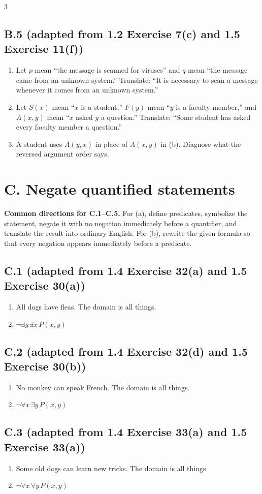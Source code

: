 \documentclass{article}
\newcommand{\problem}[2]{%
  \par
  \subsection*{#1 {\normalfont\footnotesize (#2)}}%
}
\begin{document}
\begin{multicols}{3}
\problem{B.5}{adapted from 1.2 Exercise 7(c) and 1.5 Exercise 11(f)}
\begin{enumerate}[label=(\alph*)]
  \item Let $p$ mean ``the message is scanned for viruses'' and $q$ mean ``the
        message came from an unknown system.'' Translate: ``It is necessary to
        scan a message whenever it comes from an unknown system.''
  \item Let $S(x)$ mean ``$x$ is a student,'' $F(y)$ mean ``$y$ is a faculty
        member,'' and $A(x,y)$ mean ``$x$ asked $y$ a question.'' Translate:
        ``Some student has asked every faculty member a question.''
  \item A student uses $A(y,x)$ in place of $A(x,y)$ in (b). Diagnose what the
        reversed argument order says.
\end{enumerate}
\section*{C. Negate quantified statements}

\textbf{Common directions for C.1--C.5.} For (a), define predicates, symbolize
the statement, negate it with no negation immediately before a quantifier, and
translate the result into ordinary English. For (b), rewrite the given formula
so that every negation appears immediately before a predicate.

\problem{C.1}{adapted from 1.4 Exercise 32(a) and 1.5 Exercise 30(a)}
\begin{enumerate}[label=(\alph*)]
  \item All dogs have fleas. The domain is all things.
  \item $\neg\exists y\,\exists x\,P(x,y)$
\end{enumerate}

\problem{C.2}{adapted from 1.4 Exercise 32(d) and 1.5 Exercise 30(b)}
\begin{enumerate}[label=(\alph*)]
  \item No monkey can speak French. The domain is all things.
  \item $\neg\forall x\,\exists y\,P(x,y)$
\end{enumerate}

\columnbreak
\problem{C.3}{adapted from 1.4 Exercise 33(a) and 1.5 Exercise 33(a)}
\begin{enumerate}[label=(\alph*)]
  \item Some old dogs can learn new tricks. The domain is all things.
  \item $\neg\forall x\,\forall y\,P(x,y)$
\end{enumerate}


\end{multicols}
\end{document}
